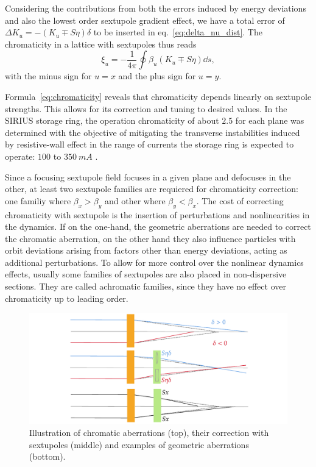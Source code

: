 Considering the contributions from both the errors induced by energy deviations and also the lowest order sextupole gradient effect, we have a total error of $\Delta K_u = -(K_u \mp S\eta)\delta$ to be inserted in eq.~\eqref{eq:delta_nu_dist}. The chromaticity in a lattice with sextupoles thus reads
\begin{equation}
    \xi_{u}=-\frac{1}{4\pi}\oint\beta_{u}(K_{u}\mp S\eta)\dd{s},
    \label{eq:chromaticity}
\end{equation}
with the minus sign for $u=x$ and the plus sign for $u=y$.

Formula~\eqref{eq:chromaticity} reveals that chromaticity depends linearly on sextupole strengths. This allows for its correction and tuning to desired values. In the SIRIUS storage ring, the operation chromaticity of about $2.5$ for each plane was determined with the objective of mitigating the transverse instabilities induced by resistive-wall effect in the range of currents the storage ring is expected to operate: $100$ to $350~\unit{mA}$ \cite[section 7.3]{sa_study_2018}.

 Since a focusing sextupole field focuses in a given plane and defocuses in the other, at least two sextupole families are requiered for chromaticity correction: one familiy where $\beta_x > \beta_y$ and other where $\beta_y < \beta_x$. The cost of correcting chromaticity with sextupole is the insertion of perturbations and nonlinearities in the dynamics. If on the one-hand, the geometric aberrations are needed to correct the chromatic aberration, on the other hand they also influence particles with orbit deviations arising from factors other than energy deviations, acting as additional perturbations. To allow for more control over the nonlinear dynamics effects, usually some families of sextupoles are also placed in non-dispersive sections. They are called achromatic families, since they have no effect over chromaticity up to leading order.
\begin{figure}
    \centering
    \includegraphics[width=\textwidth]{Images/chromaticity.pdf}
    \caption[Illustration of chromatic aberrations, their correction with sextupoles and examples of geometric aberrations.]{Illustration of chromatic aberrations (top), their correction with sextupoles (middle) and examples of geometric aberrations (bottom).}
    \label{fig:chromaticity}
\end{figure}

